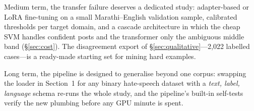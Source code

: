 Medium term, the transfer failure deserves a dedicated study: adapter-based or
LoRA fine-tuning on a small Marathi--English validation sample, calibrated
thresholds per target domain, and a cascade architecture in which the cheap SVM
handles confident posts and the transformer only the ambiguous middle band
(\S\ref{sec:cost}). The disagreement export of \S\ref{sec:qualitative}---2{,}022
labelled cases---is a ready-made starting set for mining hard examples.

Long term, the pipeline is designed to generalise beyond one corpus: swapping the
loader in Section~1 for any binary hate-speech dataset with a \emph{text, label,
language} schema re-runs the whole study, and the pipeline's built-in self-tests
verify the new plumbing before any GPU minute is spent.
